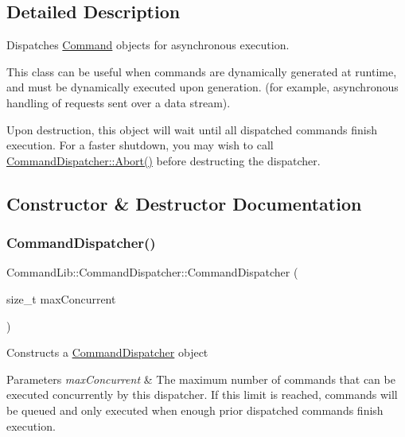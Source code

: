\subsection{Detailed Description}
Dispatches \mbox{\hyperlink{class_command_lib_1_1_command}{Command}} objects for asynchronous execution. 

This class can be useful when commands are dynamically generated at runtime, and must be dynamically executed upon generation. (for example, asynchronous handling of requests sent over a data stream). 

Upon destruction, this object will wait until all dispatched commands finish execution. For a faster shutdown, you may wish to call \mbox{\hyperlink{class_command_lib_1_1_command_dispatcher_ade1b36f9203de1426d7dff4f83808bec}{Command\+Dispatcher\+::\+Abort()}} before destructing the dispatcher. 

\subsection{Constructor \& Destructor Documentation}
\mbox{\label{class_command_lib_1_1_command_dispatcher_a9ef89de55c915fbd5f2e61784d67d8a0}} 
\subsubsection{\texorpdfstring{Command\+Dispatcher()}{CommandDispatcher()}}
{\footnotesize\ttfamily Command\+Lib\+::\+Command\+Dispatcher\+::\+Command\+Dispatcher (\begin{DoxyParamCaption}\item[{size\+\_\+t}]{max\+Concurrent }\end{DoxyParamCaption})\hspace{0.3cm}{\ttfamily [explicit]}}



Constructs a \mbox{\hyperlink{class_command_lib_1_1_command_dispatcher}{Command\+Dispatcher}} object 


\begin{DoxyParams}{Parameters}
{\em max\+Concurrent} & The maximum number of commands that can be executed concurrently by this dispatcher. If this limit is reached, commands will be queued and only executed when enough prior dispatched commands finish execution. \\
\hline
\end{DoxyParams}


